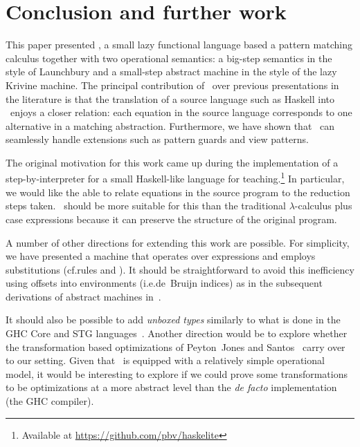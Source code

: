 
\section{Conclusion and further work}\label{sec:conclusion}

This paper presented \lambdaPMC, a small lazy functional language
based a pattern matching calculus together with two operational
semantics: a big-step semantics in the style of Launchbury and a
small-step abstract machine in the style of the lazy Krivine machine.
The principal contribution of \lambdaPMC\ over previous presentations
in the literature is that the translation of a source language such as
Haskell into \lambdaPMC\ enjoys a closer relation: each equation in
the source language corresponds to one alternative in a matching
abstraction.  Furthermore, we have shown that \lambdaPMC\ can
seamlessly handle extensions such as pattern guards and view patterns.

The original motivation for this work came up during the
implementation of a step-by-interpreter for a small Haskell-like
language for teaching.\footnote{Available at
  \url{https://github.com/pbv/haskelite}} In particular, we would like
the able to relate equations in the source program to the reduction
steps taken.  \lambdaPMC\ should be more suitable for this than the
traditional $\lambda$-calculus plus case expressions because
it can preserve the structure of the original program.

A number of other directions for extending this work are possible.  For
simplicity, we have presented a machine that operates over expressions
and employs substitutions (cf.\@ rules  and
).  It should be straightforward to avoid this
inefficiency using offsets into environments (i.e.\@ de~Bruijn
indices) as in the subsequent derivations of abstract machines
in~\cite{sestof_1997}.

It should also be possible to add \emph{unboxed types} similarly to
what is done in the GHC Core and STG languages~\cite{jones_1992}.
Another direction would be to explore whether the transformation based
optimizations of Peyton~Jones and Santos~\cite{peytonjones_1997a}
carry over to our setting.  Given that \lambdaPMC\ is equipped with a
relatively simple operational model, it would be interesting to
explore if we could prove some transformations to be optimizations
at a more abstract level than the \emph{de facto} implementation (the
GHC compiler).



